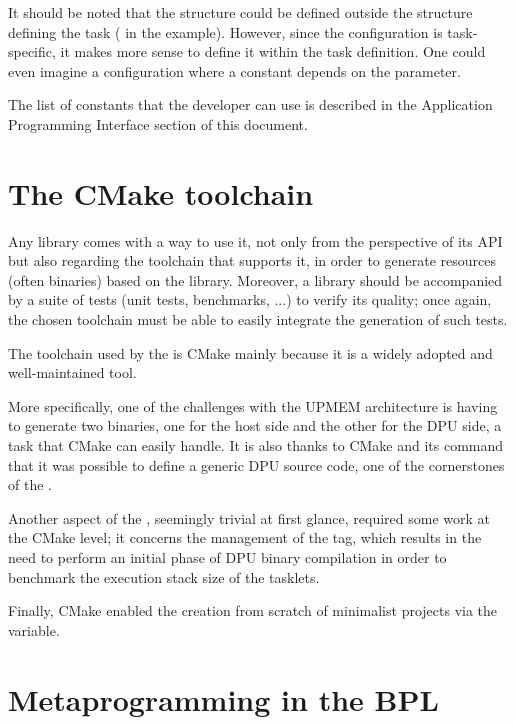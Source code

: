 It should be noted that the  structure could be defined outside the structure defining the 
task ( in the example). However, since the configuration is task-specific, 
it makes more sense to define it within the task definition. One could even imagine a configuration 
where a constant depends on the  parameter.

The list of constants that the developer can use is described in the Application Programming 
Interface section of this document.


\section{The CMake toolchain}

Any library comes with a way to use it, not only from the perspective of its API but also regarding the toolchain that supports it, 
in order to generate resources (often binaries) based on the library. 
Moreover, a library should be accompanied by a suite of tests (unit tests, benchmarks, ...) to verify its quality; 
once again, the chosen toolchain must be able to easily integrate the generation of such tests.

The toolchain used by the \BPL is CMake mainly because it is a widely adopted and well-maintained tool.

More specifically, one of the challenges with the UPMEM architecture is having to generate two binaries, 
one for the host side and the other for the DPU side, a task that CMake can easily handle.
It is also thanks to CMake and its  command that it was possible to define 
a generic DPU source code, one of the cornerstones of the \BPL.

Another aspect of the \BPL, seemingly trivial at first glance, required some work at the CMake level; 
it concerns the management of the  tag, which results in the need to perform an initial phase of DPU binary 
compilation in order to benchmark the execution stack size of the tasklets.

Finally, CMake enabled the creation from scratch of minimalist \BPL projects via the  variable.


\section{Metaprogramming in the BPL}

